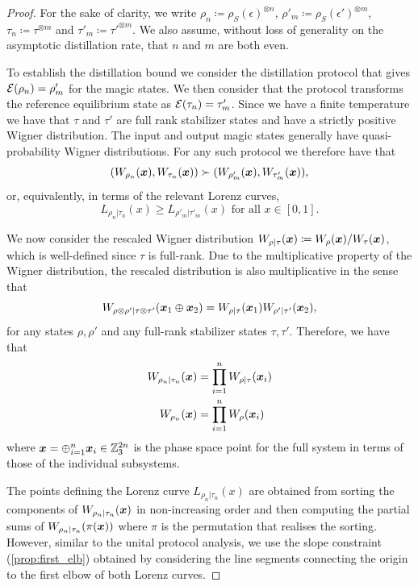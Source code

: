 \documentclass[pra,
aps,
twocolumn,
superscriptaddress,
groupedaddress,
nofootinbib,
reprint
]{revtex4-1}
\begin{document}
\begin{proof}	\label{thm:free-energy-bound-proof}
For the sake of clarity, we write $\rho_n \coloneqq \rho_S(\epsilon)^{\otimes n}$, $\rho'_m \coloneqq \rho_S(\epsilon')^{\otimes m}$, $\tau_n \coloneqq \tau^{\otimes m}$ and $\tau'_m \coloneqq \tau'^{\otimes m}$.  We also assume, without loss of generality on the asymptotic distillation rate, that $n$ and $m$ are both even.

To establish the distillation bound we consider the distillation protocol that gives ${\mathcal E}( \rho_n) = \rho'_m$ for the magic states. 
We then consider that the protocol transforms the reference equilibrium state as ${\mathcal E}( \tau_n) = \tau'_m$.
Since we have a finite temperature we have that $\tau$ and $\tau'$ are full rank stabilizer states and have a strictly positive Wigner distribution. The input and output magic states generally have quasi-probability Wigner distributions. 
For any such protocol we therefore have that
\begin{equation}
	( W_{\rho_n}(\bm{x}), W_{\tau_n}(\bm{x}) ) \succ ( W_{\rho'_m}(\bm{x}), W_{\tau'_m}(\bm{x}) ),
\end{equation}
or, equivalently, in terms of the relevant Lorenz curves,
\begin{equation}
	L_{\rho_n |\tau_n}(x) \ge L_{\rho'_m |\tau'_m}(x) \mbox{ for all } x \in [0,1].
\end{equation}

We now consider the rescaled Wigner distribution $W_{\rho | \tau}(\boldsymbol{x}) \coloneqq W_\rho(\boldsymbol{x})/W_\tau(\boldsymbol{x})$, which is well-defined since $\tau$ is full-rank. 
Due to the multiplicative property of the Wigner distribution, the rescaled distribution is also multiplicative in the sense that
\begin{equation}
	W_{\rho \otimes \rho' | \tau \otimes \tau'} (\boldsymbol{x}_1 \oplus \boldsymbol{x}_2) = W_{\rho | \tau}(\boldsymbol{x}_1)W_{\rho' | \tau'}(\boldsymbol{x}_2),
\end{equation}
for any states $\rho, \rho'$ and any full-rank stabilizer states $\tau, \tau'$.
Therefore, we have that
\begin{align}
	W_{\rho_n |\tau_n} (\boldsymbol{x}) &= \prod_{i=1}^n W_{\rho|\tau}(\boldsymbol{x}_i)\\
	W_{\rho_n } (\boldsymbol{x}) &= \prod_{i=1}^n W_\rho(\boldsymbol{x}_i)
\end{align}
where $\boldsymbol{x} = \oplus_{i=1}^n \boldsymbol{x}_i \in \mathbb{Z}_3^{2n}$ is the phase space point for the full system in terms of those of the individual subsystems.

The points defining the Lorenz curve $L_{\rho_n |\tau_n}(x)$ are obtained from sorting the components of $W_{\rho_n |\tau_n}(\boldsymbol{x})$ in non-increasing order and then computing the partial sums of $W_{\rho_n |\tau_n}(\pi(\boldsymbol{x}))$ where $\pi$ is the permutation that realises the sorting. 
However, similar to the unital protocol analysis, we use the slope constraint (\cref{prop:first_elb}) obtained by considering the line segments connecting the origin to the first elbow of both Lorenz curves.


\end{proof}
\end{document}
